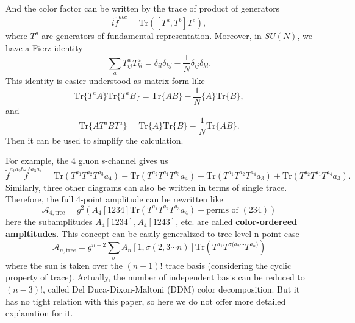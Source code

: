 \documentclass[12pt]{article}
\numberwithin{equation}{section}
\begin{document}
And the color factor can be written by the trace of product of generators
\begin{equation}
    i\tilde{f}^{abc}=\mathrm{Tr}([T^a,T^b]T^c),
\end{equation}
where $T^a$ are generators of fundamental representation. Moreover, in $SU(N)$, we have a Fierz identity
\begin{equation}
    \sum_{a}T^a_{ij}T^a_{kl}=\delta_{il}\delta_{kj}-\frac{1}{N}\delta_{ij}\delta_{kl}.
\end{equation}
This identity is easier understood as matrix form like 
\begin{equation}
    \mathrm{Tr}\{T^aA\}\mathrm{Tr}\{T^aB\}=\mathrm{Tr}\{AB\}-\frac{1}{N}\{A\}\mathrm{Tr}\{B\},
\end{equation}
and
\begin{equation}
    \mathrm{Tr}\{AT^aBT^a\}=\mathrm{Tr}\{A\}\mathrm{Tr}\{B\}-\frac{1}{N}\mathrm{Tr}\{AB\}.
\end{equation}
Then it can be used to simplify the calculation.

For example, the 4 gluon s-channel gives us
\begin{equation}
    \tilde{f}^{a_1a_2b}\tilde{f}^{ba_3a_4}=\mathrm{Tr}(T^{a_1}T^{a_2}T^{a_3}{a_4})-\mathrm{Tr}(T^{a_2}T^{a_1}T^{a_3}{a_4})-\mathrm{Tr}(T^{a_1}T^{a_2}T^{a_4}{a_3})+\mathrm{Tr}(T^{a_2}T^{a_1}T^{a_4}{a_3}).
\end{equation}
Similarly, three other diagrams can also be written in terms of single trace. Therefore, the full 4-point amplitude can be rewritten like
\begin{equation}
    \mathcal{A}_{4,\text{tree}}=g^2(A_4[1234]\mathrm{Tr}(T^{a_1}T^{a_2}T^{a_3}{a_4})+\text{perms of } (234) )
\end{equation}
here the subamplitudes $A_4[1234],A_4[1243]$, etc. are called \textbf{color-ordereed ampltitudes}. This concept can be easily generalized to tree-level n-point case
\begin{equation}
    \mathcal{A}_{n,\text{tree}}=g^{n-2}\sum_{\sigma}A_n[1,\sigma(2,3\cdots n)]\mathrm{Tr}(T^{a_1}T^{\sigma(a_2\cdots}T^{a_n)})
\end{equation}
where the sun is taken over the $(n-1)!$ trace basis (considering the cyclic property of trace). Actually, the number of independent basis can be reduced to $(n-3)!$, called Del Duca-Dixon-Maltoni (DDM) color decomposition\cite{DelDuca:1999rs}. But it has no tight relation with this paper, so here we do not offer more detailed explanation for it. 
\end{document}
